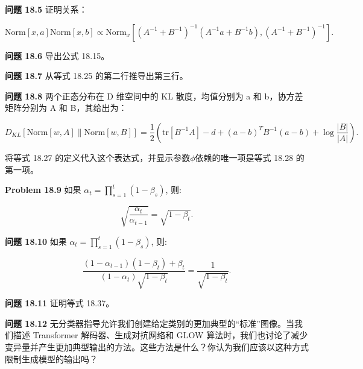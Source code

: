 \textbf{问题 18.5} 证明关系：

\begin{equation}
\text{Norm}[x, a] \text{Norm}[x, b] \propto \text{Norm}_x \left[ (A^{-1} + B^{-1})^{-1}(A^{-1}a + B^{-1}b), (A^{-1} + B^{-1})^{-1} \right]. 
\end{equation}

\textbf{问题 18.6} 导出公式 18.15。

\textbf{问题 18.7} 从等式 18.25 的第二行推导出第三行。

\textbf{问题 18.8} 两个正态分布在 D 维空间中的 KL 散度，均值分别为 a 和 b，协方差矩阵分别为 A 和 B，其给出为：

\begin{equation}
D_{KL} [\text{Norm}[w, A] \| \text{Norm}[w, B]] = \frac{1}{2} \left( \text{tr}[B^{-1}A] - d + (a - b)^T B^{-1}(a - b) + \log \frac{|B|}{|A|} \right). 
\end{equation}

将等式 18.27 的定义代入这个表达式，并显示参数\(\phi\)依赖的唯一项是等式 18.28 的第一项。

\textbf{Problem 18.9} 如果 \(\alpha_t = \prod_{s=1}^{t} (1 - \beta_s)\), 则:

\begin{equation}
\sqrt{\frac{\alpha_t}{\alpha_{t-1}}} = \sqrt{1 - \beta_t}. 
\end{equation}

\textbf{问题 18.10} 如果 \(\alpha_t = \prod_{s=1}^{t} (1 - \beta_s)\), 则:

\begin{equation}
\frac{(1 - \alpha_{t-1})(1 - \beta_t) + \beta_t}{(1 - \alpha_t)\sqrt{1 - \beta_t}} = \frac{1}{\sqrt{1 - \beta_t}}. 
\end{equation}

\textbf{问题 18.11} 证明等式 18.37。

\textbf{问题 18.12} 无分类器指导允许我们创建给定类别的更加典型的“标准”图像。当我们描述 Transformer 解码器、生成对抗网络和 GLOW 算法时，我们也讨论了减少变异量并产生更加典型输出的方法。这些方法是什么？你认为我们应该以这种方式限制生成模型的输出吗？
